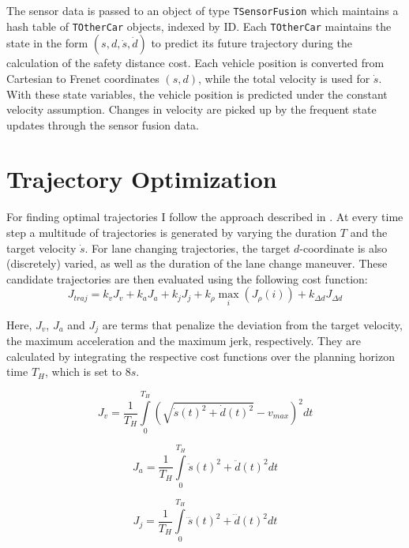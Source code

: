 \documentclass[twoside]{article}
\newcommand{\code}[1]{{\texttt{#1}}}
\begin{document}
The sensor data is passed to an object of type \code{TSensorFusion} which maintains a hash table of
\code{TOtherCar} objects, indexed by ID. Each \code{TOtherCar} maintains the state in
the form $(s,d,\dot s, \dot d)$ to predict its future trajectory during the calculation of the safety distance cost. Each vehicle position is converted from Cartesian to Frenet coordinates $(s,d)$, while the total velocity is used for $\dot s$. With these state variables, the
vehicle position is predicted under the constant velocity assumption. Changes in velocity are
picked up by the frequent state updates through the sensor fusion data.
\section{Trajectory Optimization}
For finding optimal trajectories I follow the approach described in \cite{werling2010optimal}.
At every time step a multitude of trajectories is generated by varying the duration $T$ and
the target velocity $\dot s$. For lane changing trajectories, the target $d$-coordinate is also
(discretely) varied, as well as the duration of the lane change maneuver. These candidate trajectories are then evaluated using the following cost function:
\begin{equation}
J_{traj} = k_v J_{v} + k_a J_{a} + k_j J_{j} +  k_{\rho} \underset{i}\max(J_{\rho}(i)) + k_{\Delta d}J_{\Delta d} %
\end{equation}

Here, $J_{v}$, $J_{a}$ and $J_{j}$ are terms that penalize the deviation from the target velocity,
the maximum acceleration and the maximum jerk, respectively. They are calculated by integrating
the respective cost functions over the planning horizon time $T_H$, which is set to $8s$.

\begin{equation}
J_{v} = \frac{1}{T_H}\int\limits_0^{T_{H}} \left(\sqrt{\dot s(t)^2 + \dot d(t)^2} - v_{max}\right)^2 dt
\end{equation}

\begin{equation}
J_{a} = \frac{1}{T_H}\int\limits_0^{T_{H}}\ddot s(t)^2 + \ddot d(t)^2 dt
\end{equation}

\begin{equation}
J_{j} = \frac{1}{T_H}\int\limits_0^{T_{H}}\dddot s(t)^2 + \dddot d(t)^2 dt
\end{equation}
\end{document}
